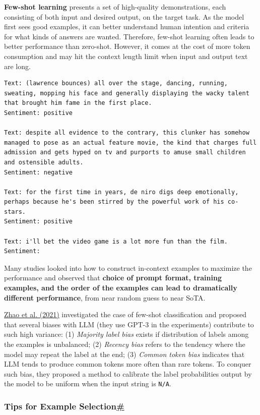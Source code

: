 \textbf{Few-shot learning} presents a set of high-quality demonstrations, each consisting of both input and desired output, on the target task. As the model first sees good examples, it can better understand human intention and criteria for what kinds of answers are wanted. Therefore, few-shot learning often leads to better performance than zero-shot. However, it comes at the cost of more token consumption and may hit the context length limit when input and output text are long.

\begin{verbatim}
Text: (lawrence bounces) all over the stage, dancing, running, sweating, mopping his face and generally displaying the wacky talent that brought him fame in the first place.
Sentiment: positive

Text: despite all evidence to the contrary, this clunker has somehow managed to pose as an actual feature movie, the kind that charges full admission and gets hyped on tv and purports to amuse small children and ostensible adults.
Sentiment: negative

Text: for the first time in years, de niro digs deep emotionally, perhaps because he's been stirred by the powerful work of his co-stars.
Sentiment: positive

Text: i'll bet the video game is a lot more fun than the film.
Sentiment:
\end{verbatim}

Many studies looked into how to construct in-context examples to maximize the performance and observed that \textbf{choice of prompt format, training examples, and the order of the examples can lead to dramatically different performance}, from near random guess to near SoTA.

\href{https://arxiv.org/abs/2102.09690}{Zhao et al. (2021)} investigated the case of few-shot classification and proposed that several biases with LLM (they use GPT-3 in the experiments) contribute to such high variance: (1) \emph{Majority label bias} exists if distribution of labels among the examples is unbalanced; (2) \emph{Recency bias} refers to the tendency where the model may repeat the label at the end; (3) \emph{Common token bias} indicates that LLM tends to produce common tokens more often than rare tokens. To conquer such bias, they proposed a method to calibrate the label probabilities output by the model to be uniform when the input string is \texttt{N/A}.

\subsubsection{\texorpdfstring{Tips for Example Selection\hyperref[tips-for-example-selection]{\#}}{Tips for Example Selection\#}}\label{tips-for-example-selection}

